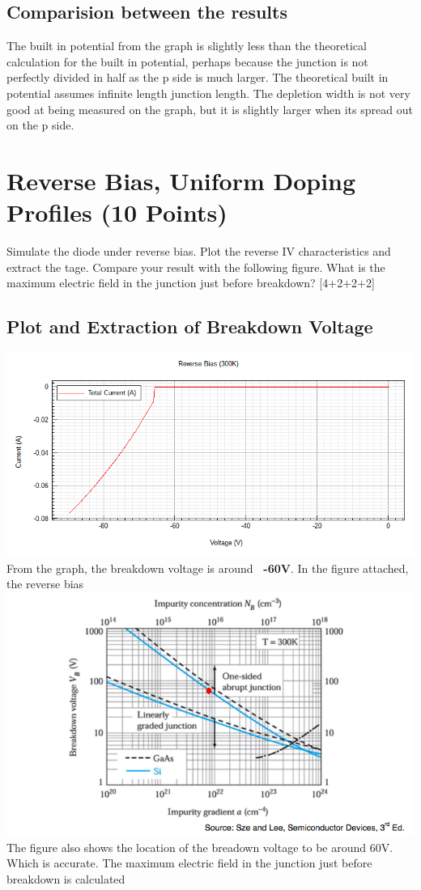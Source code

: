\documentclass[12pt]{article}
\begin{document}
\subsection{Comparision between the results }
The built in potential from the graph is slightly less than the theoretical calculation for the built in potential, perhaps because the junction is not perfectly divided in half as the p side is much larger. The theoretical built in potential assumes infinite length junction length. The depletion width is not very good at being measured on the graph, but it is slightly larger when its spread out on the p side.


\section{Reverse Bias, Uniform Doping Profiles (10 Points)}

Simulate the diode under reverse bias. Plot the reverse IV characteristics and extract the tage. Compare your result with the following figure. What is the maximum electric field in the junction just before breakdown? [4+2+2+2]

\subsection{Plot and Extraction of Breakdown Voltage}
\includegraphics[width=\textwidth]{2a.png}
From the graph, the breakdown voltage is around \textbf{~-60V}. In the figure attached, the reverse bias
\includegraphics[width=\textwidth]{2b.png}
The figure also shows the location of the breadown voltage to be around 60V. Which is accurate.
The maximum electric field in the junction just before breakdown is calculated
\end{document}
